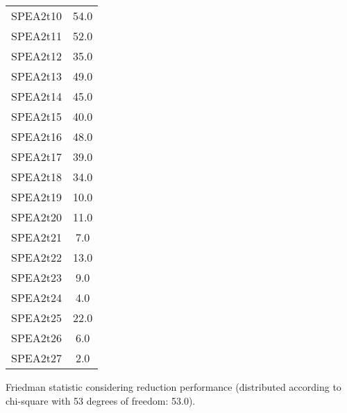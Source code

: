 \documentclass{article}
\begin{document}
\begin{table}[!htp]
\begin{tabular}{c|c}
SPEA2t10&54.0\\
SPEA2t11&52.0\\
SPEA2t12&35.0\\
SPEA2t13&49.0\\
SPEA2t14&45.0\\
SPEA2t15&40.0\\
SPEA2t16&48.0\\
SPEA2t17&39.0\\
SPEA2t18&34.0\\
SPEA2t19&10.0\\
SPEA2t20&11.0\\
SPEA2t21&7.0\\
SPEA2t22&13.0\\
SPEA2t23&9.0\\
SPEA2t24&4.0\\
SPEA2t25&22.0\\
SPEA2t26&6.0\\
SPEA2t27&2.0\\
\end{tabular}
\end{table}


Friedman statistic considering reduction performance (distributed according to chi-square with 53 degrees of freedom: 53.0).
\end{document}
